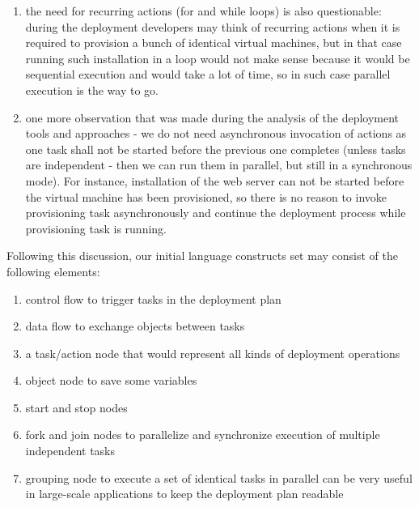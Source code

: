 \begin{enumerate}
\item  the need for recurring actions (for and while loops) is also questionable: during the deployment developers may think of recurring actions when it is required to provision a bunch of identical virtual machines, but in that case running such installation in a loop would not make sense because it would be sequential execution and would take a lot of time, so in such case parallel execution is the way to go.

\item  one more observation that was made during the analysis of the deployment tools and approaches - we do not need asynchronous invocation of actions as one task shall not be started before the previous one completes (unless tasks are independent - then we can run them in parallel, but still in a synchronous mode). For instance, installation of the web server can not be started before the virtual machine has been provisioned, so there is no reason to invoke provisioning task asynchronously and continue the deployment process while provisioning task is running.
\end{enumerate}

\noindent 

\noindent Following this discussion, our initial language constructs set may consist of the following elements: 

\begin{enumerate}
\item  control flow to trigger tasks in the deployment plan

\item  data flow to exchange objects between tasks

\item  a task/action node that would represent all kinds of deployment operations

\item  object node to save some variables

\item  start and stop nodes

\item  fork and join nodes to parallelize and synchronize execution of multiple independent tasks

\item  grouping node to execute a set of identical tasks in parallel can be very useful in large-scale applications to keep the deployment plan readable
\end{enumerate}

